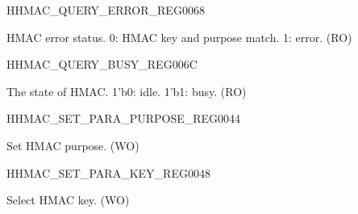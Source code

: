 \begin{register}{H}{HMAC\_QUERY\_ERROR\_REG}{\hexprefix{}0068}\label{regdesc:HMACQUERYERRORREG}
%
%
\regnewline%
\begin{regdesc}\begin{reglist}
\label{fielddesc:HMACQUREYCHECK}\item [HMAC\_QUREY\_CHECK] HMAC error status.
0: HMAC key and purpose match.
1: error.
 (RO)
\end{reglist}\end{regdesc}
\end{register}


\begin{register}{H}{HMAC\_QUERY\_BUSY\_REG}{\hexprefix{}006C}\label{regdesc:HMACQUERYBUSYREG}
%
%
\regnewline%
\begin{regdesc}\begin{reglist}
\label{fielddesc:HMACBUSYSTATE}\item [HMAC\_BUSY\_STATE] The state of HMAC.
1'b0: idle.
1'b1: busy.
 (RO)
\end{reglist}\end{regdesc}
\end{register}


\begin{register}{H}{HMAC\_SET\_PARA\_PURPOSE\_REG}{\hexprefix{}0044}\label{regdesc:HMACSETPARAPURPOSEREG}
%
%
\regnewline%
\begin{regdesc}\begin{reglist}
\label{fielddesc:HMACPURPOSESET}\item [HMAC\_PURPOSE\_SET] Set HMAC purpose. (WO)
\end{reglist}\end{regdesc}
\end{register}


\begin{register}{H}{HMAC\_SET\_PARA\_KEY\_REG}{\hexprefix{}0048}\label{regdesc:HMACSETPARAKEYREG}
%
%
\regnewline%
\begin{regdesc}\begin{reglist}
\label{fielddesc:HMACKEYSET}\item [HMAC\_KEY\_SET] Select HMAC key. (WO)
\end{reglist}\end{regdesc}
\end{register}


